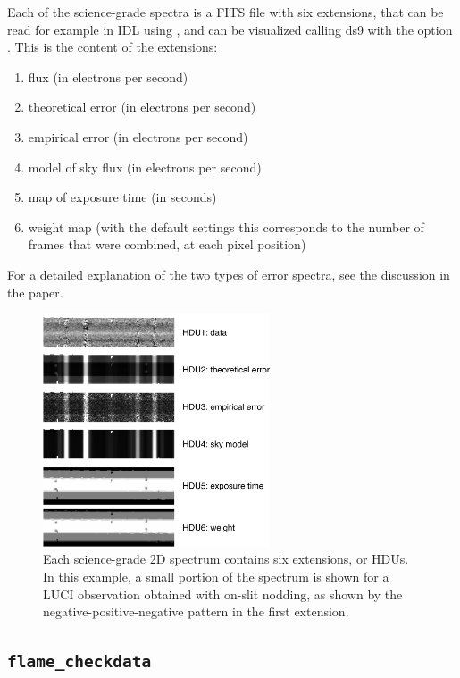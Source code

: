 \documentclass[a4paper]{article}
\begin{document}
\begin{sloppypar}
Each of the science-grade spectra is a FITS file with six extensions, that can be read for example in IDL using , and can be visualized calling ds9 with the option . This is the content of the extensions:
\begin{enumerate}
\item flux (in electrons per second)
\item theoretical error (in electrons per second)
\item empirical error (in electrons per second)
\item model of sky flux (in electrons per second)
\item map of exposure time (in seconds)
\item weight map (with the default settings this corresponds to the number of frames that were combined, at each pixel position)
\end{enumerate}

For a detailed explanation of the two types of error spectra, see the discussion in the paper.

\begin{figure}[tbp]
\centering
\includegraphics[width=0.6\textwidth]{extensions}
\caption{Each science-grade 2D spectrum contains six extensions, or HDUs. In this example, a small portion of the spectrum is shown for a LUCI observation obtained with on-slit nodding, as shown by the negative-positive-negative pattern in the first extension.}
\label{fig:extensions}
\end{figure}



\subsection{\texttt{flame\_checkdata}}
\label{sec:checkdata}


\end{sloppypar}
\end{document}
